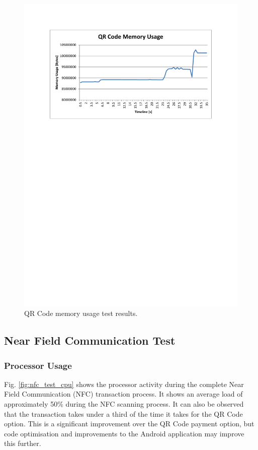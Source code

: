 \begin{figure}
 \centering 
 \includegraphics[clip=true, trim = 0 520 0 70,
 scale=0.7]{qrcode_test_mem}
 \caption{QR Code memory usage test results.}
 \label{fig:qrcode_test_mem}
\end{figure}

\subsection{Near Field Communication Test}

\subsubsection{Processor Usage}

Fig. \ref{fig:nfc_test_cpu} shows the processor activity during the complete Near
Field Communication (NFC) transaction process. It shows an average load of approximately
50\% during the NFC scanning process. It can also be observed that the transaction takes
under a third of the time it takes for the QR Code option. This is a significant
improvement over the QR Code payment option, but code optimisation and improvements to
the Android application may improve this further.

